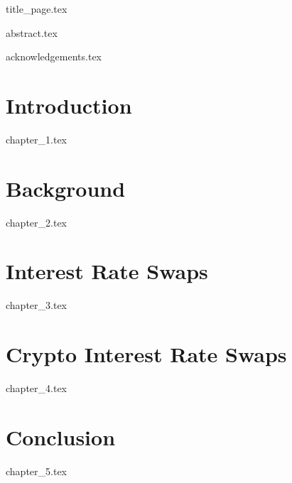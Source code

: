 \documentclass[11pt,a4paper,oneside]{book}
\theoremstyle{plain}
\theoremstyle{definition}
\theoremstyle{remark}
\begin{document}
\pagestyle{plain}


\frontmatter
{title_page.tex}

\clearpage 
\newpage 

{abstract.tex}
\newpage 

{acknowledgements.tex}
\newpage

\setcounter{tocdepth}{2} 
\cleardoublepage
\tableofcontents
\cleardoublepage
\listoffigures
\cleardoublepage
\listoftables



\mainmatter
\chapter{Introduction}
{chapter_1.tex}

\newpage
\chapter{Background}
{chapter_2.tex}

\newpage
\chapter{Interest Rate Swaps}
{chapter_3.tex}

\newpage
\chapter{Crypto Interest Rate Swaps}
{chapter_4.tex}

\newpage
\chapter{Conclusion}
{chapter_5.tex}



\end{document}
